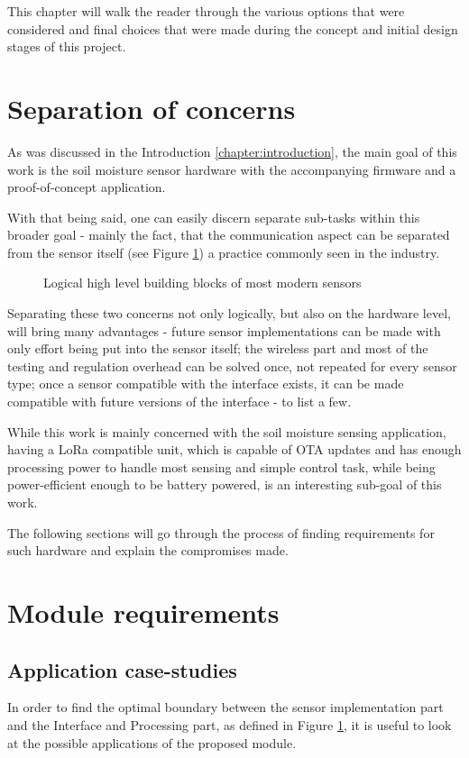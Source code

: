 
This chapter will walk the reader through the various options that were considered and final choices that were made during the concept and initial design stages of this project.

\section{Separation of concerns}
As was discussed in the Introduction \ref{chapter:introduction}, the main goal of this work is the soil moisture sensor hardware with the accompanying firmware and a proof-of-concept application.

With that being said, one can easily discern separate sub-tasks within this broader goal - mainly the fact, that the communication aspect can be separated from the sensor itself (see Figure \ref{fig:device-split}) a practice commonly seen in the industry.

\begin{figure}
    
    \caption{\label{fig:device-split} Logical high level building blocks of most modern sensors}
\end{figure}

Separating these two concerns not only logically, but also on the hardware level, will bring many advantages - future sensor implementations can be made with only effort being put into the sensor itself; the wireless part and most of the testing and regulation overhead can be solved once, not repeated for every sensor type; once a sensor compatible with the interface exists, it can be made compatible with future versions of the interface - to list a few.

While this work is mainly concerned with the soil moisture sensing application, having a LoRa compatible unit, which is capable of OTA updates and has enough processing power to handle most sensing and simple control task, while being power-efficient enough to be battery powered, is an interesting sub-goal of this work.

The following sections will go through the process of finding requirements for such hardware and explain the compromises made.

\section{Module requirements}
\subsection{\label{section:application-case-studies} Application case-studies}
In order to find the optimal boundary between the sensor implementation part and the Interface and Processing part, as defined in Figure \ref{fig:device-split}, it is useful to look at the possible applications of the proposed module.

